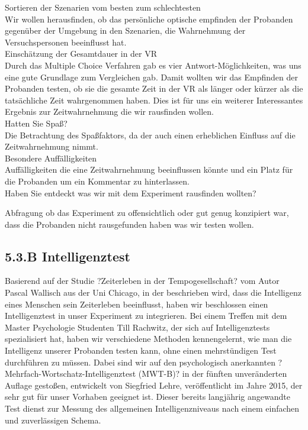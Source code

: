 \documentclass{Bericht}
\begin{document}
Sortieren der Szenarien vom besten zum schlechtesten \\

Wir wollen herausfinden, ob das persönliche optische empfinden der Probanden gegenüber der Umgebung in den Szenarien, die Wahrnehmung der Versuchspersonen beeinflusst hat. \\

Einschätzung der Gesamtdauer in der VR\\

Durch das Multiple Choice Verfahren gab es vier Antwort-Möglichkeiten, was uns eine gute Grundlage zum Vergleichen gab. Damit wollten wir das Empfinden der Probanden testen, ob sie die gesamte Zeit in der VR als länger oder kürzer als die tatsächliche Zeit wahrgenommen haben. Dies ist für uns ein weiterer Interessantes Ergebnis zur Zeitwahrnehmung die wir rausfinden wollen. \\

Hatten Sie Spaß? \\

Die Betrachtung des Spaßfaktors,  da der auch einen erheblichen Einfluss auf die Zeitwahrnehmung nimmt. \\

Besondere Auffälligkeiten \\

Auffälligkeiten die eine Zeitwahrnehmung beeinflussen könnte und ein Platz für die Probanden um ein Kommentar zu hinterlassen. \\

Haben Sie entdeckt was wir mit dem Experiment rausfinden wollten?

Abfragung ob das Experiment zu offensichtlich oder gut genug konzipiert war, dass die Probanden nicht rausgefunden haben was wir testen wollen. 

\par

\subsection{5.3.B Intelligenztest}

Basierend auf der Studie ?Zeiterleben in der Tempogesellschaft? vom Autor Pascal Wallisch aus der Uni Chicago, in der beschrieben wird, dass die Intelligenz eines Menschen sein Zeiterleben beeinflusst, haben wir beschlossen einen Intelligenztest in unser Experiment zu integrieren. Bei einem Treffen mit dem Master Psychologie Studenten Till Rachwitz, der sich auf Intelligenztests spezialisiert hat, haben wir verschiedene Methoden kennengelernt, wie man die Intelligenz unserer Probanden testen kann, ohne einen mehrstündigen Test durchführen zu müssen. Dabei sind wir auf den psychologisch anerkannten ?Mehrfach-Wortschatz-Intelligenztest (MWT-B)? in der fünften unveränderten Auflage gestoßen, entwickelt von Siegfried Lehre, veröffentlicht im Jahre 2015, der sehr gut für unser Vorhaben geeignet ist. Dieser bereits langjährig angewandte Test dienst zur Messung des allgemeinen Intelligenzniveaus nach einem einfachen und zuverlässigen Schema. \\
\end{document}
